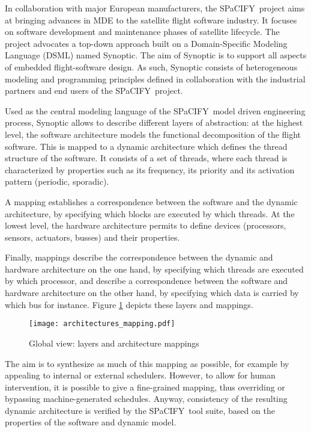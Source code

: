 \documentclass[copyright,creativecommons]{eptcs}
\newcommand{\spacify}{SPaCIFY}
\renewcommand{\:}{{:}}
\begin{document}
In collaboration with major European manufacturers, the \spacify\ project aims at bringing advances in MDE to the satellite flight software industry. It focuses on software development and maintenance phases of satellite lifecycle. The project advocates a top-down approach built on a Domain-Specific Modeling Language (DSML) named Synoptic. The aim of Synoptic is to support all aspects of embedded flight-software design. As such, Synoptic consists of heterogeneous modeling and programming principles defined in collaboration with the industrial partners and end users of the \spacify\ project.


Used as the central modeling language of the \spacify\ model driven engineering process, Synoptic allows to describe different layers of abstraction: at the highest level, the software architecture models the functional decomposition of the flight software. This is mapped to a dynamic architecture which defines the thread structure of the software. It consists of a set of threads, where each thread is characterized by properties such as its frequency, its priority and its activation pattern (periodic, sporadic).

A mapping establishes a correspondence between the software and the dynamic architecture, by specifying which blocks are executed by which threads. At the lowest level, the hardware architecture permits to define  devices (processors, sensors, actuators, busses) and their properties. 

Finally, mappings describe the correspondence between the dynamic and hardware architecture on the one hand, by specifying which threads are executed by which processor, and describe a correspondence between the software and hardware architecture on the other hand, by specifying which data is carried by which bus for instance. Figure \ref{mappings} depicts these layers and mappings.


\begin{figure}[h!]
\begin{center}
\texttt{[image: architectures\_mapping.pdf]}
\end{center}
\caption{Global view: layers and architecture mappings}
\label{mappings}
\end{figure}	

The aim is to synthesize as much of this mapping as possible, for example by appealing to internal or external schedulers. However, to allow for human intervention, it is possible to give a fine-grained mapping, thus overriding or bypassing machine-generated schedules. Anyway, consistency of the resulting dynamic architecture is verified by the \spacify\ tool suite, based on the properties of the software and dynamic model.
\end{document}
